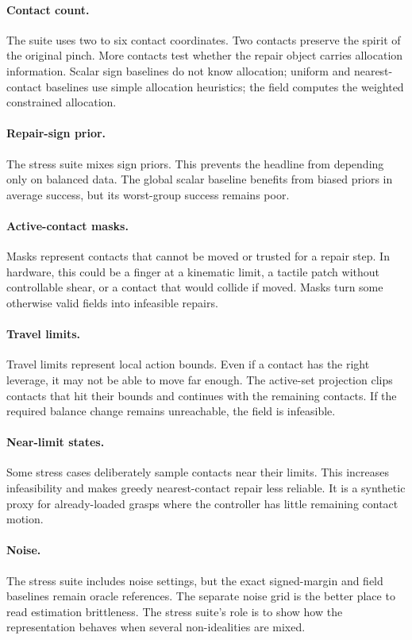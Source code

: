 \documentclass{article}
\begin{document}
\paragraph{Contact count.}
The suite uses two to six contact coordinates. Two contacts preserve the spirit of the original pinch. More contacts test whether the repair object carries allocation information. Scalar sign baselines do not know allocation; uniform and nearest-contact baselines use simple allocation heuristics; the field computes the weighted constrained allocation.

\paragraph{Repair-sign prior.}
The stress suite mixes sign priors. This prevents the headline from depending only on balanced data. The global scalar baseline benefits from biased priors in average success, but its worst-group success remains poor.

\paragraph{Active-contact masks.}
Masks represent contacts that cannot be moved or trusted for a repair step. In hardware, this could be a finger at a kinematic limit, a tactile patch without controllable shear, or a contact that would collide if moved. Masks turn some otherwise valid fields into infeasible repairs.

\paragraph{Travel limits.}
Travel limits represent local action bounds. Even if a contact has the right leverage, it may not be able to move far enough. The active-set projection clips contacts that hit their bounds and continues with the remaining contacts. If the required balance change remains unreachable, the field is infeasible.

\paragraph{Near-limit states.}
Some stress cases deliberately sample contacts near their limits. This increases infeasibility and makes greedy nearest-contact repair less reliable. It is a synthetic proxy for already-loaded grasps where the controller has little remaining contact motion.

\paragraph{Noise.}
The stress suite includes noise settings, but the exact signed-margin and field baselines remain oracle references. The separate noise grid is the better place to read estimation brittleness. The stress suite's role is to show how the representation behaves when several non-idealities are mixed.
\end{document}
